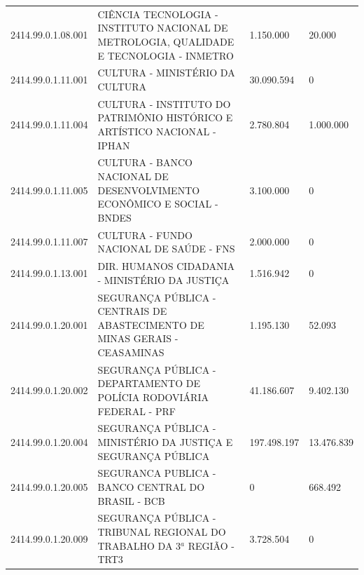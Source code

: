 \documentclass{article}
\begin{document}
\begin{longtable}[c]{m{2cm}|m{11cm}|m{2cm}m{2cm}}
\multicolumn{1}{C{2cm}|}{2414.99.0.1.08.001} & \multicolumn{1}{L{11cm}|}{CIÊNCIA TECNOLOGIA - INSTITUTO NACIONAL DE METROLOGIA, QUALIDADE E TECNOLOGIA - INMETRO} & \multicolumn{1}{R{2cm}|}{1.150.000} & \multicolumn{1}{R{2cm}}{20.000} \\
\multicolumn{1}{C{2cm}|}{2414.99.0.1.11.001} & \multicolumn{1}{L{11cm}|}{CULTURA - MINISTÉRIO DA CULTURA} & \multicolumn{1}{R{2cm}|}{30.090.594} & \multicolumn{1}{R{2cm}}{            0} \\
\multicolumn{1}{C{2cm}|}{2414.99.0.1.11.004} & \multicolumn{1}{L{11cm}|}{CULTURA - INSTITUTO DO PATRIMÔNIO HISTÓRICO E ARTÍSTICO NACIONAL - IPHAN} & \multicolumn{1}{R{2cm}|}{2.780.804} & \multicolumn{1}{R{2cm}}{1.000.000} \\
\multicolumn{1}{C{2cm}|}{2414.99.0.1.11.005} & \multicolumn{1}{L{11cm}|}{CULTURA - BANCO NACIONAL DE DESENVOLVIMENTO ECONÔMICO E SOCIAL - BNDES} & \multicolumn{1}{R{2cm}|}{3.100.000} & \multicolumn{1}{R{2cm}}{            0} \\
\multicolumn{1}{C{2cm}|}{2414.99.0.1.11.007} & \multicolumn{1}{L{11cm}|}{CULTURA - FUNDO NACIONAL DE SAÚDE - FNS} & \multicolumn{1}{R{2cm}|}{2.000.000} & \multicolumn{1}{R{2cm}}{            0} \\
\multicolumn{1}{C{2cm}|}{2414.99.0.1.13.001} & \multicolumn{1}{L{11cm}|}{DIR. HUMANOS CIDADANIA - MINISTÉRIO DA JUSTIÇA} & \multicolumn{1}{R{2cm}|}{1.516.942} & \multicolumn{1}{R{2cm}}{            0} \\
\multicolumn{1}{C{2cm}|}{2414.99.0.1.20.001} & \multicolumn{1}{L{11cm}|}{SEGURANÇA PÚBLICA - CENTRAIS DE ABASTECIMENTO DE MINAS GERAIS - CEASAMINAS} & \multicolumn{1}{R{2cm}|}{1.195.130} & \multicolumn{1}{R{2cm}}{52.093} \\
\multicolumn{1}{C{2cm}|}{2414.99.0.1.20.002} & \multicolumn{1}{L{11cm}|}{SEGURANÇA PÚBLICA - DEPARTAMENTO DE POLÍCIA RODOVIÁRIA FEDERAL - PRF} & \multicolumn{1}{R{2cm}|}{41.186.607} & \multicolumn{1}{R{2cm}}{9.402.130} \\
\multicolumn{1}{C{2cm}|}{2414.99.0.1.20.004} & \multicolumn{1}{L{11cm}|}{SEGURANÇA PÚBLICA - MINISTÉRIO DA JUSTIÇA E SEGURANÇA PÚBLICA} & \multicolumn{1}{R{2cm}|}{197.498.197} & \multicolumn{1}{R{2cm}}{13.476.839} \\
\multicolumn{1}{C{2cm}|}{2414.99.0.1.20.005} & \multicolumn{1}{L{11cm}|}{SEGURANCA PUBLICA - BANCO CENTRAL DO BRASIL - BCB} & \multicolumn{1}{R{2cm}|}{            0} & \multicolumn{1}{R{2cm}}{668.492} \\
\multicolumn{1}{C{2cm}|}{2414.99.0.1.20.009} & \multicolumn{1}{L{11cm}|}{SEGURANÇA PÚBLICA - TRIBUNAL REGIONAL DO TRABALHO DA 3$^a$ REGIÃO - TRT3} & \multicolumn{1}{R{2cm}|}{3.728.504} & \multicolumn{1}{R{2cm}}{            0} \\

\end{longtable}
\end{document}
